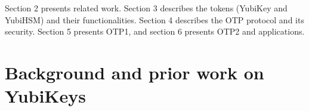 Section 2 presents related work.
%
Section 3 describes the tokens (YubiKey and YubiHSM) and their functionalities.
%
Section 4 describes the OTP protocol and its security. Section 5 presents OTP1,
and section 6 presents OTP2 and applications.

\section{Background and prior work on YubiKeys}

